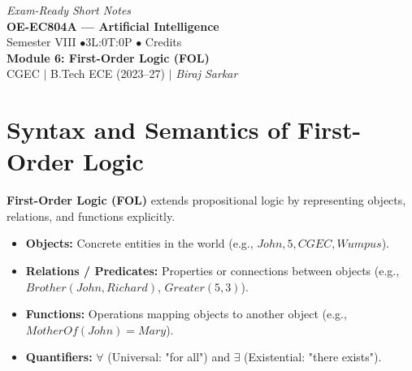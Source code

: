 \documentclass[12pt,a4paper]{article}
\begin{document}
\begin{center}
  \hfill \textit{Exam-Ready Short Notes} \\
  \vspace{6pt}
  {\LARGE\bfseries\color{myred} OE-EC804A --- Artificial Intelligence}\\[5pt]
  {\normalsize\color{mydark} Semester VIII \quad$\bullet$\quad 3L:0T:0P \quad$\bullet$ Credits}\\[3pt]
  {\normalsize\color{myteal}\textbf{Module 6: First-Order Logic (FOL)}}\\[3pt]
  {\small\color{mydark} CGEC \;$|$\; B.Tech ECE (2023--27) \;$|$\; \textit{Biraj Sarkar}}
\end{center}
\vspace{2pt}
\noindent{\color{myred}\rule{\linewidth}{1.5pt}}
\vspace{2pt}

\hypersetup{linkcolor=mydark}
\tableofcontents
\hypersetup{linkcolor=myteal}
\newpage

\section{Syntax and Semantics of First-Order Logic}

\textbf{First-Order Logic (FOL)} extends propositional logic by representing objects, relations, and functions explicitly.

\begin{tcolorbox}[defbox, title={Elements of First-Order Logic}]
  \begin{itemize}[leftmargin=*, noitemsep]
    \item \textbf{Objects:} Concrete entities in the world (e.g., $John, 5, CGEC, Wumpus$).
    \item \textbf{Relations / Predicates:} Properties or connections between objects (e.g., $Brother(John, Richard)$, $Greater(5, 3)$).
    \item \textbf{Functions:} Operations mapping objects to another object (e.g., $MotherOf(John) = Mary$).
    \item \textbf{Quantifiers:} $\forall$ (Universal: "for all") and $\exists$ (Existential: "there exists").
  \end{itemize}
\end{tcolorbox}
\end{document}
